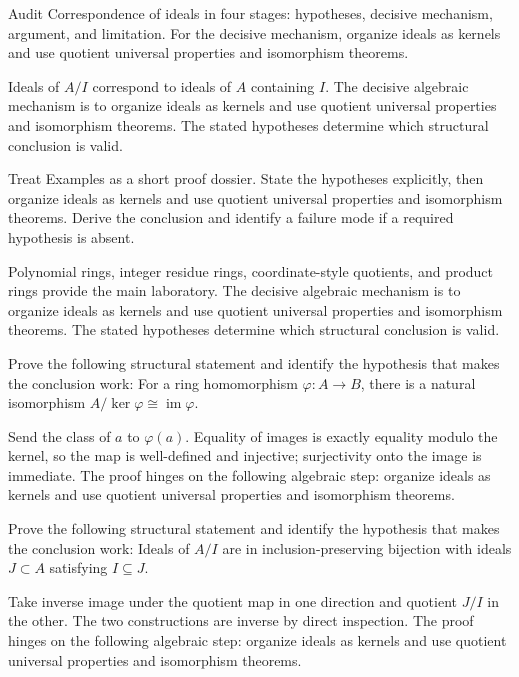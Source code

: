 \begin{problem}\label{prob:v01-problem-07}
Audit Correspondence of ideals in four stages: hypotheses, decisive mechanism, argument, and limitation. For the decisive mechanism, organize ideals as kernels and use quotient universal properties and isomorphism theorems.
\end{problem}
\begin{solution}
Ideals of $A/I$ correspond to ideals of $A$ containing $I$. The decisive algebraic mechanism is to organize ideals as kernels and use quotient universal properties and isomorphism theorems. The stated hypotheses determine which structural conclusion is valid.
\end{solution}

\begin{problem}\label{prob:v01-problem-08}
Treat Examples as a short proof dossier. State the hypotheses explicitly, then organize ideals as kernels and use quotient universal properties and isomorphism theorems. Derive the conclusion and identify a failure mode if a required hypothesis is absent.
\end{problem}
\begin{solution}
Polynomial rings, integer residue rings, coordinate-style quotients, and product rings provide the main laboratory. The decisive algebraic mechanism is to organize ideals as kernels and use quotient universal properties and isomorphism theorems. The stated hypotheses determine which structural conclusion is valid.
\end{solution}

\begin{problem}\label{prob:v01-problem-09}
Prove the following structural statement and identify the hypothesis that makes the conclusion work: For a ring homomorphism $\varphi:A\to B$, there is a natural isomorphism $A/\ker\varphi\cong\operatorname{im}\varphi$.
\end{problem}
\begin{solution}
Send the class of $a$ to $\varphi(a)$. Equality of images is exactly equality modulo the kernel, so the map is well-defined and injective; surjectivity onto the image is immediate. The proof hinges on the following algebraic step: organize ideals as kernels and use quotient universal properties and isomorphism theorems.
\end{solution}

\begin{problem}\label{prob:v01-problem-10}
Prove the following structural statement and identify the hypothesis that makes the conclusion work: Ideals of $A/I$ are in inclusion-preserving bijection with ideals $J\subset A$ satisfying $I\subseteq J$.
\end{problem}
\begin{solution}
Take inverse image under the quotient map in one direction and quotient $J/I$ in the other. The two constructions are inverse by direct inspection. The proof hinges on the following algebraic step: organize ideals as kernels and use quotient universal properties and isomorphism theorems.
\end{solution}


